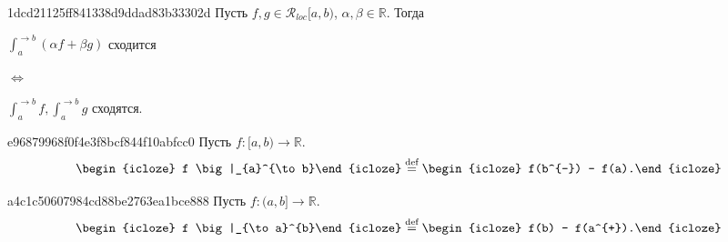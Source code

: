 \begin{note}{1dcd21125ff841338d9ddad83b33302d}
    Пусть \({ f, g \in \mathcal R_{loc}[a, b) }\),\: \({ \alpha, \beta \in \mathbb R }\).
    Тогда
    \begin{center}
        \begin{icloze}{2}\({ \displaystyle \int_{a}^{\to b} (\alpha f + \beta g) }\) сходится \end{icloze}
        \begin{icloze}{3}\({ \iff }\) \end{icloze}
        \begin{icloze}{1}\({ \displaystyle \int_{a}^{\to b} f, \int_{a}^{\to b} g }\) сходятся.\end{icloze}
    \end{center}
\end{note}

\begin{note}{5ca16eceb7f145959f15bd1feb33442e}
    \subsubsection{<<\begin{icloze}{3}Замена переменной в несобственном интеграле\end{icloze}>>}

    Пусть \begin{icloze}{2}\({ \varphi \in C^{1}[\alpha, \beta) }\) монотонна,\: \({ f \in C[\varphi(\alpha), \varphi(\beta^{-})) }\).\end{icloze}
    Тогда
    \begin{icloze}{1}
        \[
            \int_{\alpha}^{\to \beta} (f \circ \varphi) \varphi' = \int_{\varphi(\alpha)}^{\to \varphi(\beta^{-})} f.
        \]
    \end{icloze}
\end{note}

\begin{note}{e96879968f0f4e3f8bcf844f10abfcc0}
    Пусть \({ f : [a, b) \to \mathbb R }\).
    \[
        \begin{icloze}{2}f \big|_{a}^{\to b}\end{icloze} \overset{\text{def}}= \begin{icloze}{1}f(b^{-}) - f(a).\end{icloze}
    \]
\end{note}

\begin{note}{a4c1c50607984cd88be2763ea1bce888}
    Пусть \({ f : (a, b] \to \mathbb R }\).
    \[
        \begin{icloze}{2}f \big|_{\to a}^{b}\end{icloze} \overset{\text{def}}= \begin{icloze}{1}f(b) - f(a^{+}).\end{icloze}
    \]
\end{note}

